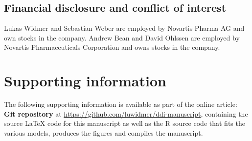 \documentclass[AMA,STIX1COL]{WileyNJD-v2}
\begin{document}
\subsection*{Financial disclosure and conflict of interest}

Lukas Widmer and Sebastian Weber are employed by Novartis Pharma AG and own stocks in the company. Andrew Bean and David Ohlssen are employed by Novartis Pharmaceuticals Corporation and owns stocks in the company.


\section*{Supporting information}

The following supporting information is available as part of the online article:
\\

\noindent
\textbf{Git repository} at \url{https://github.com/luwidmer/ddi-manuscript}, containing the source LaTeX code for this manuscript as well as the R source code that fits the various models, produces the figures and compiles the manuscript.


\appendix

\nocite{*}%
%

\clearpage
%
%
\end{document}
